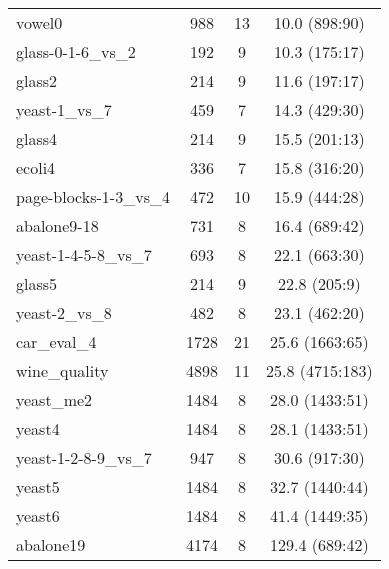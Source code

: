 \begin{table}[!htbp]
\begin{tabular}{lccc}
		vowel0 & 988   & 13    & 10.0 (898:90)\\
		glass-0-1-6\_vs\_2 & 192   & 9     & 10.3 (175:17)\\
		glass2 & 214   & 9     & 11.6 (197:17)\\
		yeast-1\_vs\_7 & 459   & 7     & 14.3 (429:30)\\
		glass4 & 214   & 9     & 15.5 (201:13)\\
		ecoli4 & 336   & 7     & 15.8 (316:20)\\
		page-blocks-1-3\_vs\_4 & 472   & 10    & 15.9 (444:28)\\
		abalone9-18 & 731   & 8     & 16.4 (689:42)\\
		yeast-1-4-5-8\_vs\_7 & 693   & 8     & 22.1 (663:30)\\
		glass5 & 214   & 9     & 22.8 (205:9)\\
		yeast-2\_vs\_8 & 482   & 8     & 23.1 (462:20)\\
		car\_eval\_4 & 1728  & 21    & 25.6 (1663:65)\\
		wine\_quality & 4898  & 11    & 25.8 (4715:183)\\
		yeast\_me2 & 1484  & 8     & 28.0 (1433:51)\\
		yeast4 & 1484  & 8     & 28.1 (1433:51)\\
		yeast-1-2-8-9\_vs\_7 & 947   & 8     & 30.6 (917:30)\\
		yeast5 & 1484  & 8     & 32.7 (1440:44)\\
		yeast6 & 1484  & 8     & 41.4 (1449:35)\\
		abalone19 & 4174  & 8     & 129.4 (689:42)\\
	\end{tabular}%
	\label{tab:dataDecription}%
\end{table}%